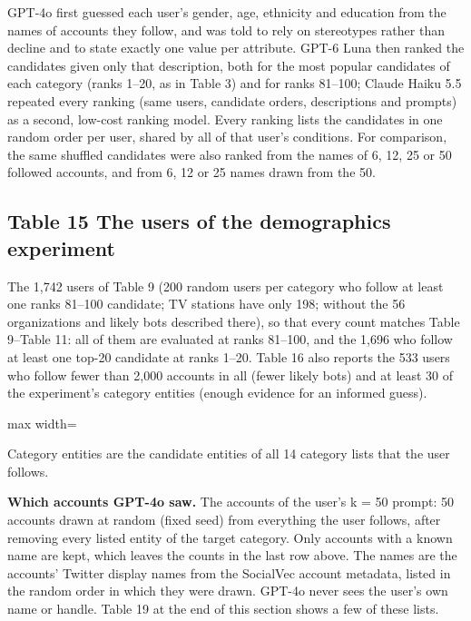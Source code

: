 \documentclass[10pt]{article}
\begin{document}
GPT-4o first guessed each user's gender, age, ethnicity and education from the names of accounts they follow, and was told to rely on stereotypes rather than decline and to state exactly one value per attribute. GPT-6 Luna then ranked the candidates given only that description, both for the most popular candidates of each category (ranks 1--20, as in Table 3) and for ranks 81--100; Claude Haiku 5.5 repeated every ranking (same users, candidate orders, descriptions and prompts) as a second, low-cost ranking model. Every ranking lists the candidates in one random order per user, shared by all of that user's conditions. For comparison, the same shuffled candidates were also ranked from the names of 6, 12, 25 or 50 followed accounts, and from 6, 12 or 25 names drawn from the 50.

\subsection*{Table 15 \textperiodcentered{} The users of the demographics experiment}
The 1,742 users of Table 9 (200 random users per category who follow at least one ranks 81--100 candidate; TV stations have only 198; without the 56 organizations and likely bots described there), so that every count matches Table 9--Table 11: all of them are evaluated at ranks 81--100, and the 1,696 who follow at least one top-20 candidate at ranks 1--20. Table 16 also reports the 533 users who follow fewer than 2,000 accounts in all (fewer likely bots) and at least 30 of the experiment's category entities (enough evidence for an informed guess).

\begin{center}\begin{adjustbox}{max width=\linewidth}

\end{adjustbox}\end{center}

{\small Category entities are the candidate entities of all 14 category lists that the user follows.}

\textbf{Which accounts GPT-4o saw.} The accounts of the user's k = 50 prompt: 50 accounts drawn at random (fixed seed) from everything the user follows, after removing every listed entity of the target category. Only accounts with a known name are kept, which leaves the counts in the last row above. The names are the accounts' Twitter display names from the SocialVec account metadata, listed in the random order in which they were drawn. GPT-4o never sees the user's own name or handle. Table 19 at the end of this section shows a few of these lists.
\end{document}
